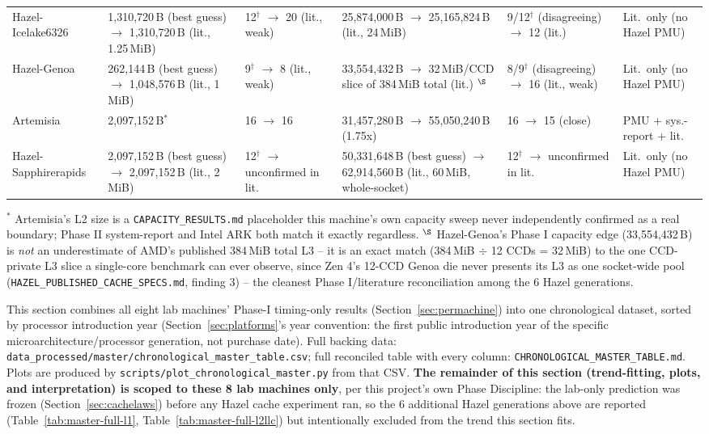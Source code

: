 \documentclass{article}
\newcommand{\cmark}{\ding{51}}
\newcommand{\xmark}{\ding{55}}
\begin{document}
\begin{table}[H]
{\begin{tabularx}{\textwidth}{|X|X|X|X|X|X|}
Hazel-Icelake6326 & 1,310,720\,B (best guess) $\to$ 1,310,720\,B (lit., 1.25\,MiB) \cmark & 12$^\dagger$ $\to$ 20 (lit., weak) & 25,874,000\,B $\to$ 25,165,824\,B (lit., 24\,MiB) \cmark & 9/12$^\dagger$ (disagreeing) $\to$ 12 (lit.) & Lit.\ only (no Hazel PMU)\\
Hazel-Genoa & 262,144\,B (best guess) $\to$ 1,048,576\,B (lit., 1\,MiB) \xmark & 9$^\dagger$ $\to$ 8 (lit., weak) & 33,554,432\,B $\to$ 32\,MiB/CCD slice of 384\,MiB total (lit.) \cmark$^{\S}$ & 8/9$^\dagger$ (disagreeing) $\to$ 16 (lit., weak) & Lit.\ only (no Hazel PMU)\\
Artemisia & 2,097,152\,B$^{*}$ & 16 $\to$ 16 \cmark & 31,457,280\,B $\to$ 55,050,240\,B \xmark (1.75x) & 16 $\to$ 15 (close) & PMU + sys.-report + lit.\\
Hazel-Sapphirerapids & 2,097,152\,B (best guess) $\to$ 2,097,152\,B (lit., 2\,MiB) \cmark & 12$^\dagger$ $\to$ unconfirmed in lit. & 50,331,648\,B (best guess) $\to$ 62,914,560\,B (lit., 60\,MiB, whole-socket) \xmark & 12$^\dagger$ $\to$ unconfirmed in lit. & Lit.\ only (no Hazel PMU)\\
\hline
\end{tabularx}
}
\end{table}

$^{*}$ Artemisia's L2 size is a \texttt{CAPACITY\_RESULTS.md} placeholder this machine's own
capacity sweep never independently confirmed as a real boundary; Phase II system-report and
Intel ARK both match it exactly regardless. $^{\S}$ Hazel-Genoa's Phase I capacity edge
(33,554,432\,B) is \emph{not} an underestimate of AMD's published 384\,MiB total L3 -- it is
an exact match (384\,MiB $\div$ 12 CCDs = 32\,MiB) to the one CCD-private L3 slice a
single-core benchmark can ever observe, since Zen 4's 12-CCD Genoa die never presents its
L3 as one socket-wide pool (\texttt{HAZEL\_PUBLISHED\_CACHE\_SPECS.md}, finding 3) -- the
cleanest Phase I/literature reconciliation among the 6 Hazel generations.

This section combines all eight lab machines' Phase-I timing-only results
(Section~\ref{sec:permachine}) into one chronological dataset, sorted by processor
introduction year (Section~\ref{sec:platforms}'s year convention: the first public
introduction year of the specific microarchitecture/processor generation, not purchase
date). Full backing data:
\texttt{data\_processed/master/chronological\_master\_table.csv}; full reconciled table
with every column: \texttt{CHRONOLOGICAL\_MASTER\_TABLE.md}. Plots are produced by
\texttt{scripts/plot\_chronological\_master.py} from that CSV. \textbf{The remainder of
this section (trend-fitting, plots, and interpretation) is scoped to these 8 lab
machines only}, per this project's own Phase Discipline: the lab-only prediction was
frozen (Section~\ref{sec:cachelaws}) before any Hazel cache experiment ran, so the 6
additional Hazel generations above are reported (Table~\ref{tab:master-full-l1},
Table~\ref{tab:master-full-l2llc}) but intentionally excluded from the trend this section
fits.
\end{document}
